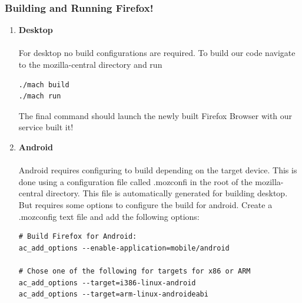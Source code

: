 \documentclass[12pt]{article}
\begin{document}
\subsubsection{Building and Running Firefox!}
	\begin{enumerate}
		\item \textbf{Desktop} \\ \\
		For desktop no build configurations are required.  To build our code navigate to the mozilla-central directory and run
\begin{lstlisting}[style=BashInputStyle]
./mach build
./mach run
\end{lstlisting}
The final command should launch the newly built Firefox Browser with our service built it!
		\item \textbf{Android} \\ \\
		Android requires configuring to build depending on the target device.  	This is done using a configuration file called .mozconfi in the root of the mozilla-central directory.  This file is automatically generated for building desktop.  But requires some options to configure the build for android.  Create a .mozconfig text file and add the following options:
		
		\begin{lstlisting}[style=BashInputStyle]
# Build Firefox for Android:
ac_add_options --enable-application=mobile/android

# Chose one of the following for targets for x86 or ARM
ac_add_options --target=i386-linux-android
ac_add_options --target=arm-linux-androideabi


\end{lstlisting}
\end{enumerate}
\end{document}

